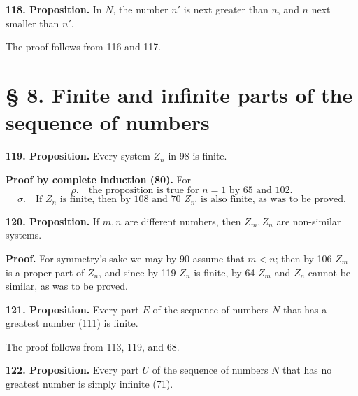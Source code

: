 \documentclass[11pt]{article}
\begin{document}
\noindent\textbf{118. Proposition.} In $N$, the number $n'$ is next greater than $n$, and $n$ next smaller than $n'$.

The proof follows from 116 and 117.

\section*{§ 8. Finite and infinite parts of the sequence of numbers}

\noindent\textbf{119. Proposition.} Every system $Z_n$ in 98 is finite.

\noindent\textbf{Proof by complete induction (80).} For
\[
\rho.\quad \text{the proposition is true for }n=1\text{ by 65 and 102.}
\]
\[
\sigma.\quad \text{If }Z_n\text{ is finite, then by 108 and 70 }Z_{n'}\text{ is also finite, as was to be proved.}
\]

\noindent\textbf{120. Proposition.} If $m,n$ are different numbers, then $Z_m,Z_n$ are non-similar systems.

\noindent\textbf{Proof.} For symmetry's sake we may by 90 assume that $m<n$; then by 106 $Z_m$ is a proper part of $Z_n$, and since by 119 $Z_n$ is finite, by 64 $Z_m$ and $Z_n$ cannot be similar, as was to be proved.

\noindent\textbf{121. Proposition.} Every part $E$ of the sequence of numbers $N$ that has a greatest number (111) is finite.

The proof follows from 113, 119, and 68.

\noindent\textbf{122. Proposition.} Every part $U$ of the sequence of numbers $N$ that has no greatest number is simply infinite (71).
\end{document}
